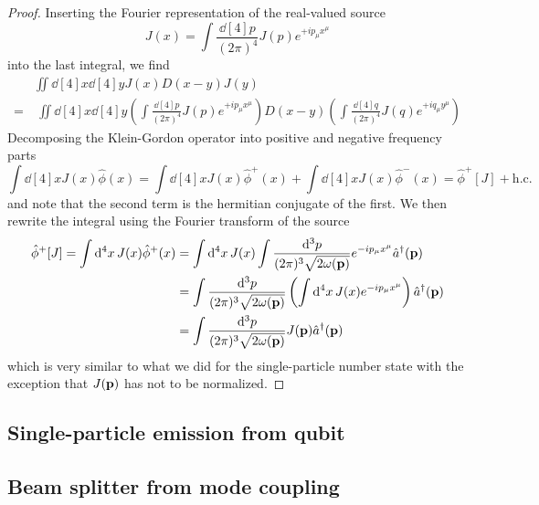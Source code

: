 \begin{proof}
	Inserting the Fourier representation of the real-valued source
	\begin{equation}
		J(x)
		=
		\int\frac{\dd[4]{p}}{(2\pi)^4}
		J(p)
		e^{+ip_\mu x^\mu}
	\end{equation}
	into the last integral, we find
	\begin{equation}
		\begin{split}
			&
			\iint\dd[4]{x}\dd[4]{y}
			J(x)
			D(x-y)
			J(y)
			\\
			=&\
			\iint\dd[4]{x}\dd[4]{y}
			\left(
				\int\frac{\dd[4]{p}}{(2\pi)^4}
				J(p)
				e^{+ip_\mu x^\mu}
			\right)
			D(x-y)
			\left(
				\int\frac{\dd[4]{q}}{(2\pi)^4}
				J(q)
				e^{+iq_\mu y^\mu}
			\right)
		\end{split}
	\end{equation}
	Decomposing the Klein-Gordon operator into positive and negative frequency parts
	\begin{equation}
		\int\dd[4]{x}
		J(x)
		\hat\phi(x)
		=
		\int\dd[4]{x}
		J(x)
		\hat\phi^+(x)
		+
		\int\dd[4]{x}
		J(x)
		\hat\phi^-(x)
		=
		\hat\phi^+[J]
		+
		\text{h.c.}
	\end{equation}
	and note that the second term is the hermitian conjugate of the first.
	We then rewrite the integral using the Fourier transform of the source
	\begin{equation}
		\begin{split}
			\hat\phi^+[J]
			=
			\int\dd[4]{x}
			J(x)
			\hat\phi^+(x)
			&=
			\int\dd[4]{x}
			J(x)
			\int\frac{\dd[3]{p}}{(2\pi)^3\sqrt{2\omega(\vb{p})}}
			e^{-ip_\mu x^\mu}
			\hat{a}^\dagger(\vb{p})
			\\
			&=
			\int\frac{\dd[3]{p}}{(2\pi)^3\sqrt{2\omega(\vb{p})}}
			\left(
				\int\dd[4]{x}
				J(x)
				e^{-ip_\mu x^\mu}
			\right)
			\hat{a}^\dagger(\vb{p})
			\\
			&=
			\int\frac{\dd[3]{p}}{(2\pi)^3\sqrt{2\omega(\vb{p})}}
			J(\vb{p})
			\hat{a}^\dagger(\vb{p})
		\end{split}
	\end{equation}
	which is very similar to what we did for the single-particle number state with the exception that $J(\vb{p})$ has not to be normalized.
\end{proof}

\subsection{Single-particle emission from qubit}

\subsection{Beam splitter from mode coupling}